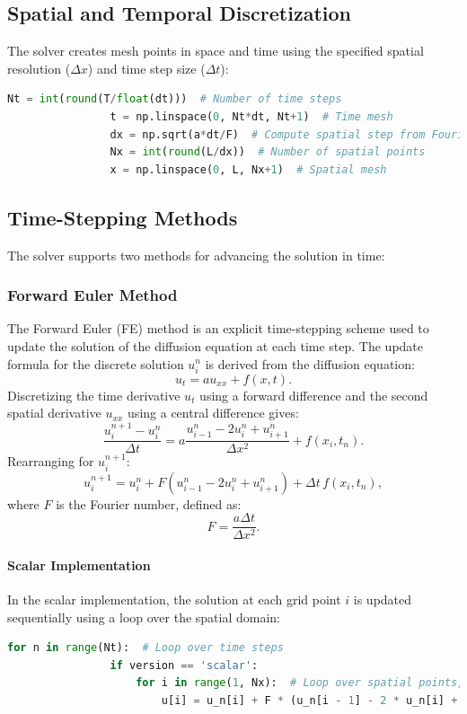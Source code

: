\documentclass{article}
\begin{document}
		\subsection{Spatial and Temporal Discretization}
	
			The solver creates mesh points in space and time using the specified spatial resolution (\( \Delta x \)) and time step size (\( \Delta t \)):
			
			\begin{lstlisting}[language=Python]
				Nt = int(round(T/float(dt)))  # Number of time steps
				t = np.linspace(0, Nt*dt, Nt+1)  # Time mesh
				dx = np.sqrt(a*dt/F)  # Compute spatial step from Fourier number
				Nx = int(round(L/dx))  # Number of spatial points
				x = np.linspace(0, L, Nx+1)  # Spatial mesh
			\end{lstlisting}
	
		\subsection{Time-Stepping Methods}
		
			The solver supports two methods for advancing the solution in time:
	
		\subsubsection{Forward Euler Method}
		
			The Forward Euler (FE) method is an explicit time-stepping scheme used to update the solution of the diffusion equation at each time step. The update formula for the discrete solution \( u_i^n \) is derived from the diffusion equation:
			\[
			u_t = a u_{xx} + f(x, t).
			\]
			Discretizing the time derivative \( u_t \) using a forward difference and the second spatial derivative \( u_{xx} \) using a central difference gives:
			\[
			\frac{u_i^{n+1} - u_i^n}{\Delta t} = a \frac{u_{i-1}^n - 2u_i^n + u_{i+1}^n}{\Delta x^2} + f(x_i, t_n).
			\]
			Rearranging for \( u_i^{n+1} \):
			\[
			u_i^{n+1} = u_i^n + F \left( u_{i-1}^n - 2u_i^n + u_{i+1}^n \right) + \Delta t \, f(x_i, t_n),
			\]
			where \( F \) is the Fourier number, defined as:
			\[
			F = \frac{a \Delta t}{\Delta x^2}.
			\]
			
			\paragraph{Scalar Implementation}
			
			In the scalar implementation, the solution at each grid point \( i \) is updated sequentially using a loop over the spatial domain:
			\begin{lstlisting}[language=Python]
			for n in range(Nt):  # Loop over time steps
				if version == 'scalar':
					for i in range(1, Nx):  # Loop over spatial points, excluding boundaries
						u[i] = u_n[i] + F * (u_n[i - 1] - 2 * u_n[i] + u_n[i + 1]) + dt * f(x[i], t[n])
			\end{lstlisting}
			
\end{document}
